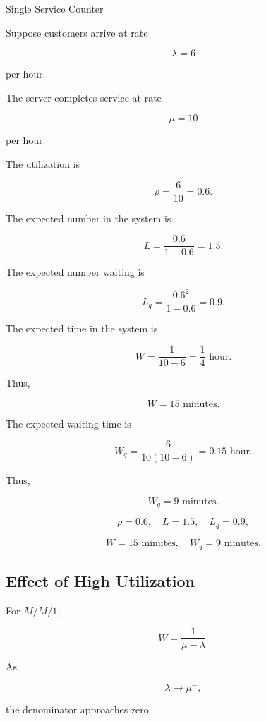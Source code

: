 \begin{workedexamplebox}{Single Service Counter}

Suppose customers arrive at rate

\[
\lambda=6
\]

per hour.

The server completes service at rate

\[
\mu=10
\]

per hour.

The utilization is

\[
\rho
=
\frac6{10}
=
0.6.
\]

The expected number in the system is

\[
L
=
\frac{0.6}{1-0.6}
=
1.5.
\]

The expected number waiting is

\[
L_q
=
\frac{0.6^2}{1-0.6}
=
0.9.
\]

The expected time in the system is

\[
W
=
\frac1{10-6}
=
\frac14
\text{ hour}.
\]

Thus,

\[
W=15
\text{ minutes}.
\]

The expected waiting time is

\[
W_q
=
\frac6{
10(10-6)
}
=
0.15
\text{ hour}.
\]

Thus,

\[
W_q=9
\text{ minutes}.
\]

\begin{answerbox}
\[
\boxed{
\rho=0.6,
\quad
L=1.5,
\quad
L_q=0.9,
}
\]

\[
\boxed{
W=15\text{ minutes},
\quad
W_q=9\text{ minutes}.
}
\]
\end{answerbox}

\end{workedexamplebox}

\subsection{Effect of High Utilization}
\label{subsec:high-utilization-effect}

For \(M/M/1\),

\[
W
=
\frac1{\mu-\lambda}.
\]

As

\[
\lambda
\to
\mu^-,
\]

the denominator approaches zero.

